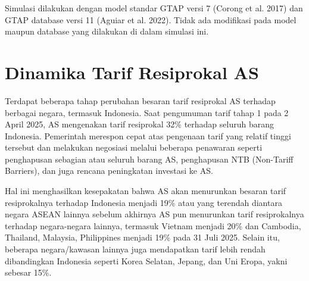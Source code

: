 \documentclass[
]{interact}
\begin{document}
Simulasi dilakukan dengan model standar GTAP versi 7 (Corong et al.
2017) dan GTAP database versi 11 (Aguiar et al. 2022). Tidak ada
modifikasi pada model maupun database yang dilakukan di dalam simulasi
ini.

\section{Dinamika Tarif Resiprokal
AS}\label{dinamika-tarif-resiprokal-as}

Terdapat beberapa tahap perubahan besaran tarif resiprokal AS terhadap
berbagai negara, termasuk Indonesia. Saat pengumuman tarif tahap 1 pada
2 April 2025, AS mengenakan tarif resiprokal 32\% terhadap seluruh
barang Indonesia. Pemerintah merespon cepat atas pengenaan tarif yang
relatif tinggi tersebut dan melakukan negosiasi melalui beberapa
penawaran seperti penghapusan sebagian atau seluruh barang AS,
penghapusan NTB (Non-Tariff Barriers), dan juga rencana peningkatan
investasi ke AS.

Hal ini menghasilkan kesepakatan bahwa AS akan menurunkan besaran tarif
resiprokalnya terhadap Indonesia menjadi 19\% atau yang terendah
diantara negara ASEAN lainnya sebelum akhirnya AS pun menurunkan tarif
resiprokalnya terhadap negara-negara lainnya, termasuk Vietnam menjadi
20\% dan Cambodia, Thailand, Malaysia, Philippines menjadi 19\% pada 31
Juli 2025. Selain itu, beberapa negara/kawasan lainnya juga mendapatkan
tarif lebih rendah dibandingkan Indonesia seperti Korea Selatan, Jepang,
dan Uni Eropa, yakni sebesar 15\%.
\end{document}
